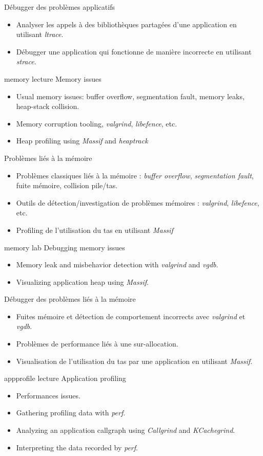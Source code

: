 {Débugger des problèmes applicatifs}
{
  \begin{itemize}
  \item Analyser les appels à des bibliothèques partagées d'une
    application en utilisant {\em ltrace}.
  \item Débugger une application qui fonctionne de manière incorrecte
    en utilisant {\em strace}.
  \end{itemize}
}
{memory}
{lecture}
{Memory issues}
{
  \begin{itemize}
  \item Usual memory issues: buffer overflow, segmentation fault,
    memory leaks, heap-stack collision.
  \item Memory corruption tooling, {\em valgrind}, {\em libefence},
    etc.
  \item Heap profiling using {\em Massif} and {\em heaptrack}
  \end{itemize}
}
{Problèmes liés à la mémoire}
{
  \begin{itemize}
  \item Problèmes classiques liés à la mémoire : {\em buffer overflow},
    {\em segmentation fault}, fuite mémoire, collision pile/tas.
  \item Outils de détection/investigation de problèmes mémoires : {\em
      valgrind}, {\em libefence}, etc.
  \item Profiling de l'utilisation du tas en utilisant {\em Massif}
  \end{itemize}
}
{memory}
{lab}
{Debugging memory issues}
{
  \begin{itemize}
  \item Memory leak and misbehavior detection with {\em valgrind} and
    {\em vgdb}.
  \item Visualizing application heap using {\em Massif}.
  \end{itemize}
}
{Débugger des problèmes liés à la mémoire}
{
  \begin{itemize}
  \item Fuites mémoire et détection de comportement incorrects avec
    {\em valgrind} et {\em vgdb}.
  \item Problèmes de performance liés à une sur-allocation.
  \item Visualisation de l'utilisation du tas par une application en
    utilisant {\em Massif}.
  \end{itemize}
}
{appprofile}
{lecture}
{Application profiling}
{
  \begin{itemize}
  \item Performances issues.
  \item Gathering profiling data with {\em perf}.
  \item Analyzing an application callgraph using {\em Callgrind}
    and {\em KCachegrind}.
  \item Interpreting the data recorded by {\em perf}.
  \end{itemize}
}
